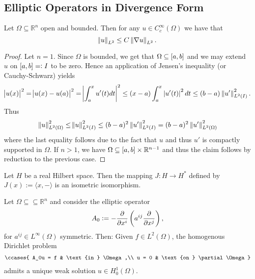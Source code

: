 \subsection*{Elliptic Operators in Divergence Form}

\begin{lemma}
	\label{lem:PI}
	Let $\Omega \subseteq \mathbb{R}^n$ open and bounded. Then for any $u \in C^\infty_c(\Omega)$ we have that
	\begin{equation*}
		\norm{u}_{L^2} \leq C\norm[0]{\nabla u}_{L^2}.
	\end{equation*}
\end{lemma}

\begin{proof}
	Let $n = 1$. Since $\Omega$ is bounded, we get that $\Omega \subseteq \intcc{a,b}$ and we may extend $u$ on $\intcc{a,b} =: I$ to be zero. Hence an application of Jensen's inequality (or Cauchy-Schwarz) yields
	\begin{equation*}
		\abs{u(x)}^2 = \abs{u(x) - u(a)}^2 = \abs[3]{\int_a^x u'(t)dt}^2 \leq (x - a) \int_a^x \abs[0]{u'(t)}^2dt \leq (b - a) \norm[0]{u'}_{L^2(I)}^2.
	\end{equation*}
	Thus
	\begin{equation*}
		\norm[0]{u}_{L^2(\Omega)}^2 \leq \norm{u}_{L^2(I)}^2 \leq (b - a)^2 \norm[0]{u'}^2_{L^2(I)} = (b - a)^2 \norm[0]{u'}_{L^2(\Omega)}^2
	\end{equation*}
	\noindent where the last equality follows due to the fact that $u$ and thus $u'$ is compactly supported in $\Omega$. If $n > 1$, we have $\Omega \subseteq \intcc{a,b} \times \mathbb{R}^{n-1}$ and thus the claim follows by reduction to the previous case.
\end{proof}

\begin{theorem}
	\label{thm:RRT}
	Let $H$ be a real Hilbert space. Then the mapping $J : H \to H^*$ defined by $J(x) := \langle x,-\rangle$ is an isometric isomorphism.
\end{theorem}

\begin{theorem}
	Let $\Omega \subseteq\subseteq \mathbb{R}^n$ and consider the elliptic operator
	\begin{equation*}
		A_0 := -\frac{\partial}{\partial x^i}\del[3]{a^{ij}\frac{\partial}{\partial x^j}},
	\end{equation*}
	\noindent for $a^{ij} \in L^\infty(\Omega)$ symmetric. Then: Given $f \in L^2(\Omega)$, the homogenous Dirichlet problem
	\begin{align}
		\label{eq:HDP}
		\ccases{
			A_0u = f & \text{in } \Omega,\\
			u = 0 & \text{on } \partial\Omega
		}
	\end{align}
	\noindent admits a unique weak solution $u \in H^1_0(\Omega)$.
\end{theorem}

